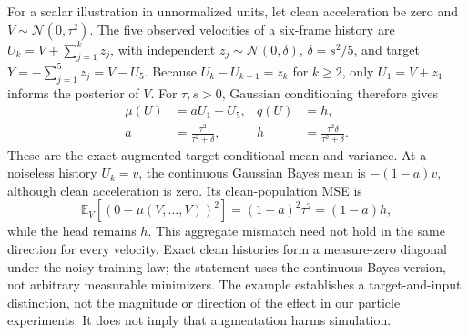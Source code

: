 For a scalar illustration in unnormalized units, let clean acceleration be zero
and $V\sim\mathcal N(0,\tau^2)$. The five observed velocities of a six-frame
history are $U_k=V+\sum_{j=1}^kz_j$, with independent
$z_j\sim\mathcal N(0,\delta)$, $\delta=s^2/5$, and target
$Y=-\sum_{j=1}^5z_j=V-U_5$. Because $U_k-U_{k-1}=z_k$ for $k\ge2$, only
$U_1=V+z_1$ informs the posterior of $V$. For $\tau,s>0$, Gaussian conditioning
therefore gives
\begin{align}
\mu(U)&=aU_1-U_5,& q(U)&=h,\nonumber\\
a&=\frac{\tau^2}{\tau^2+\delta},&
h&=\frac{\tau^2\delta}{\tau^2+\delta}.
\label{eq:noise-toy-posterior}
\end{align}
These are the exact augmented-target conditional mean and variance. At a
noiseless history $U_k=v$, the continuous Gaussian Bayes mean is $-(1-a)v$,
although clean acceleration is zero. Its clean-population MSE is
\begin{equation}
\mathbb E_V[(0-\mu(V,\ldots,V))^2]
=(1-a)^2\tau^2=(1-a)h,
\label{eq:noise-toy-clean-risk}
\end{equation}
while the head remains $h$. This aggregate mismatch need not hold in the same
direction for every velocity. Exact clean histories form a measure-zero
diagonal under the noisy training law; the statement uses the continuous Bayes
version, not arbitrary measurable minimizers. The example establishes a
target-and-input distinction, not the magnitude or direction of the effect in
our particle experiments. It does not imply that augmentation harms simulation.
